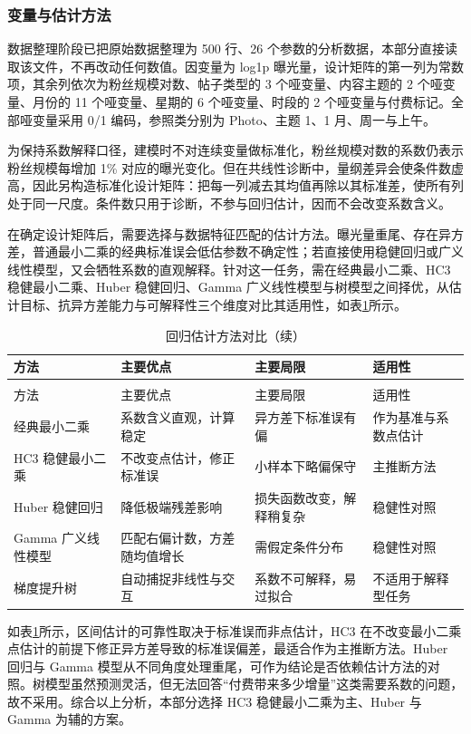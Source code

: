\subsubsection{变量与估计方法}

数据整理阶段已把原始数据整理为 500 行、26 个参数的分析数据，本部分直接读取该文件，不再改动任何数值。因变量为 log1p 曝光量，设计矩阵的第一列为常数项，其余列依次为粉丝规模对数、帖子类型的 3 个哑变量、内容主题的 2 个哑变量、月份的 11 个哑变量、星期的 6 个哑变量、时段的 2 个哑变量与付费标记。全部哑变量采用 0/1 编码，参照类分别为 Photo、主题 1、1 月、周一与上午。

为保持系数解释口径，建模时不对连续变量做标准化，粉丝规模对数的系数仍表示粉丝规模每增加 1\% 对应的曝光变化。但在共线性诊断中，量纲差异会使条件数虚高，因此另构造标准化设计矩阵：把每一列减去其均值再除以其标准差，使所有列处于同一尺度。条件数只用于诊断，不参与回归估计，因而不会改变系数含义。

在确定设计矩阵后，需要选择与数据特征匹配的估计方法。曝光量重尾、存在异方差，普通最小二乘的经典标准误会低估参数不确定性；若直接使用稳健回归或广义线性模型，又会牺牲系数的直观解释。针对这一任务，需在经典最小二乘、HC3 稳健最小二乘、Huber 稳健回归、Gamma 广义线性模型与树模型之间择优，从估计目标、抗异方差能力与可解释性三个维度对比其适用性，如表\ref{tab:algo3}所示。

\begin{longtable}{>{\centering\arraybackslash}p{}>{\centering\arraybackslash}p{}>{\centering\arraybackslash}p{}>{\centering\arraybackslash}p{}}
  \caption{回归估计方法对比}
  \label{tab:algo3} \\
  \toprule
  方法 & 主要优点 & 主要局限 & 适用性 \\
  \midrule
  \endfirsthead
  \caption{回归估计方法对比（续）} \\
  \toprule
  方法 & 主要优点 & 主要局限 & 适用性 \\
  \midrule
  \endhead
  \bottomrule
  \endfoot
  经典最小二乘 & 系数含义直观，计算稳定 & 异方差下标准误有偏 & 作为基准与系数点估计 \\
  HC3 稳健最小二乘 & 不改变点估计，修正标准误 & 小样本下略偏保守 & 主推断方法 \\
  Huber 稳健回归 & 降低极端残差影响 & 损失函数改变，解释稍复杂 & 稳健性对照 \\
  Gamma 广义线性模型 & 匹配右偏计数，方差随均值增长 & 需假定条件分布 & 稳健性对照 \\
  梯度提升树 & 自动捕捉非线性与交互 & 系数不可解释，易过拟合 & 不适用于解释型任务 \\
\end{longtable}

如表\ref{tab:algo3}所示，区间估计的可靠性取决于标准误而非点估计，HC3 在不改变最小二乘点估计的前提下修正异方差导致的标准误偏差，最适合作为主推断方法\cite{white1980}。Huber 回归与 Gamma 模型从不同角度处理重尾，可作为结论是否依赖估计方法的对照\cite{huber1964,mccullagh1989}。树模型虽然预测灵活，但无法回答“付费带来多少增量”这类需要系数的问题，故不采用。综合以上分析，本部分选择 HC3 稳健最小二乘为主、Huber 与 Gamma 为辅的方案。
